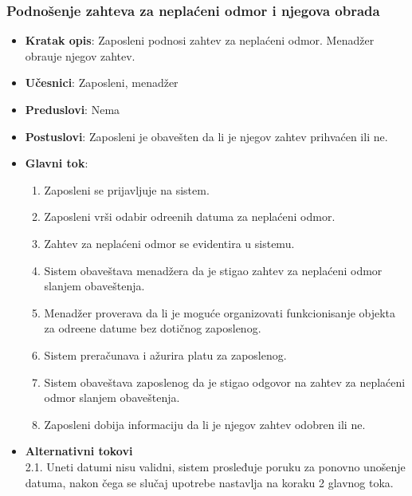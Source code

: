 \newpage
 \subsubsection{Podno\v senje zahteva za nepla\'ceni odmor i njegova obrada }
 
 
 \begin{itemize}
    \item \textbf{Kratak opis}:
  Zaposleni podnosi zahtev za nepla\'ceni odmor. Menad\v zer obra\dj uje njegov zahtev.
    \item \textbf{Učesnici}:
    Zaposleni, menad\v zer
    \item \textbf{Preduslovi}: Nema
    \item \textbf{Postuslovi}:
    Zaposleni je obave\v sten da li je njegov zahtev prihva\'cen ili ne.
    \item \textbf{Glavni tok}:
    \begin{enumerate}
        \item Zaposleni se prijavljuje na sistem.
        \item Zaposleni vr\v si odabir odre\dj enih datuma za nepla\'ceni odmor.
        \item Zahtev za nepla\'ceni odmor se evidentira u sistemu.
        \item Sistem obave\v stava menad\v zera da je stigao zahtev za nepla\'ceni odmor slanjem obaveštenja.
        \item Menad\v zer proverava da li je moguće organizovati funkcionisanje objekta za odre\dj ene datume bez dotičnog zaposlenog.
        \item Sistem prera\v cunava i a\v zurira platu za zaposlenog.
        \item Sistem obave\v stava zaposlenog da je stigao odgovor na zahtev za nepla\'ceni odmor slanjem obaveštenja.
        \item Zaposleni dobija informaciju da li je njegov zahtev odobren ili ne.
    \end{enumerate}
\item \textbf{Alternativni tokovi}\\
        2.1. Uneti datumi nisu validni, sistem prosleđuje poruku za ponovno unošenje datuma, nakon čega se slučaj upotrebe nastavlja na koraku 2 glavnog toka.

\end{itemize}

